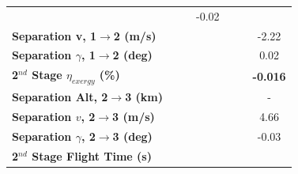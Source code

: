 \begin{table}[!ht]
\begin{tabular}{l c c c c c c}
	& \firstsecondSeparationAltmFuelOneHundredFiveNoReturn
	& \firstsecondSeparationAltmFuelOneHundredTenNoReturn
	&-0.02
	\\
	\textbf{Separation v, 1$\rightarrow$2 (m/s)}
	& \firstsecondSeparationvmFuelNinetyNoReturn
	& \firstsecondSeparationvmFuelNinetyFiveNoReturn
	& \firstsecondSeparationvmFuelStandardNoReturn
	& \firstsecondSeparationvmFuelOneHundredFiveNoReturn
	& \firstsecondSeparationvmFuelOneHundredTenNoReturn
	&-2.22
	\\
	\textbf{Separation $\gamma$, 1$\rightarrow$2 (deg)}
	& \firstsecondSeparationgammamFuelNinetyNoReturn
	& \firstsecondSeparationgammamFuelNinetyFiveNoReturn
	& \firstsecondSeparationgammamFuelStandardNoReturn
	& \firstsecondSeparationgammamFuelOneHundredFiveNoReturn
	& \firstsecondSeparationgammamFuelOneHundredTenNoReturn
	&0.02
	\\
	\hline 
	\textbf{2$^{nd}$ Stage $\eta_{exergy}$ (\%)}
	& \textbf{\secondExergyEffmFuelNinetyNoReturn}
	& \textbf{\secondExergyEffmFuelNinetyFiveNoReturn}
	& \textbf{\secondExergyEffmFuelStandardNoReturn}
	& \textbf{\secondExergyEffmFuelOneHundredFiveNoReturn}
	& \textbf{\secondExergyEffmFuelOneHundredTenNoReturn}
	& \textbf{-0.016}
	\\
	\textbf{Separation Alt, 2$\rightarrow$3 (km)}
	& \secondthirdSeparationAltmFuelNinetyNoReturn
	& \secondthirdSeparationAltmFuelNinetyFiveNoReturn
	& \secondthirdSeparationAltmFuelStandardNoReturn
	& \secondthirdSeparationAltmFuelOneHundredFiveNoReturn
	& \secondthirdSeparationAltmFuelOneHundredTenNoReturn
	& -
	\\
	\textbf{Separation $v$, 2$\rightarrow$3 (m/s)}
	& \secondthirdSeparationvmFuelNinetyNoReturn
	& \secondthirdSeparationvmFuelNinetyFiveNoReturn
	& \secondthirdSeparationvmFuelStandardNoReturn
	& \secondthirdSeparationvmFuelOneHundredFiveNoReturn
	& \secondthirdSeparationvmFuelOneHundredTenNoReturn
	&4.66
	\\
	\textbf{Separation $\gamma$, 2$\rightarrow$3 (deg)}
	& \secondthirdSeparationgammamFuelNinetyNoReturn
	& \secondthirdSeparationgammamFuelNinetyFiveNoReturn
	& \secondthirdSeparationgammamFuelStandardNoReturn
	& \secondthirdSeparationgammamFuelOneHundredFiveNoReturn
	& \secondthirdSeparationgammamFuelOneHundredTenNoReturn
	&-0.03
	\\
	\textbf{2$^{nd}$ Stage Flight Time (s)}
	& \secondFlightTimemFuelNinetyNoReturn
	& \secondFlightTimemFuelNinetyFiveNoReturn
	& \secondFlightTimemFuelStandardNoReturn
	& \secondFlightTimemFuelOneHundredFiveNoReturn
	& \secondFlightTimemFuelOneHundredTenNoReturn

\end{tabular}
\end{table}
